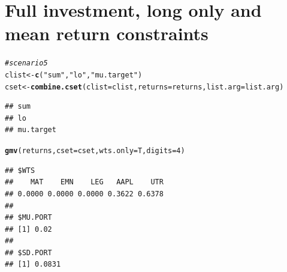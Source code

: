 \documentclass{uwstat518}\usepackage[]{graphicx}\usepackage[]{color}
\makeatletter
\newcommand{\hlstr}[1]{\textcolor[rgb]{0.192,0.494,0.8}{#1}}%
\newcommand{\hlcom}[1]{\textcolor[rgb]{0.678,0.584,0.686}{\textit{#1}}}%
\newcommand{\hlkwd}[1]{\textcolor[rgb]{0.737,0.353,0.396}{\textbf{#1}}}%
\newenvironment{kframe}{%
 \def\at@end@of@kframe{}%
 \ifinner\ifhmode%
  \def\at@end@of@kframe{\end{minipage}}%
  \begin{minipage}{\columnwidth}%
 \fi\fi%
 \def\FrameCommand##1{\hskip\@totalleftmargin \hskip-\fboxsep
 \colorbox{shadecolor}{##1}\hskip-\fboxsep
     \hskip-\linewidth \hskip-\@totalleftmargin \hskip\columnwidth}%
 \MakeFramed {\advance\hsize-\width
   \@totalleftmargin\z@ \linewidth\hsize
   \@setminipage}}%
 {\par\unskip\endMakeFramed%
 \at@end@of@kframe}
\newenvironment{knitrout}{}{} %
\makeatother
\begin{document}
\newpage
\section{Full investment, long only and mean return constraints}
\begin{knitrout}
\color{fgcolor}\begin{kframe}
\begin{alltt}
\hlcom{# scenario 5}
clist <- \hlkwd{c}(\hlstr{"sum"},\hlstr{"lo"},\hlstr{"mu.target"})
cset <-\hlkwd{combine.cset}(clist=clist,returns=returns,list.arg=list.arg)
\end{alltt}
\begin{verbatim}
## sum 
## lo 
## mu.target
\end{verbatim}
\begin{alltt}
\hlkwd{gmv}(returns, cset=cset, wts.only=T,digits=4)
\end{alltt}
\begin{verbatim}
## $WTS
##    MAT    EMN    LEG   AAPL    UTR 
## 0.0000 0.0000 0.0000 0.3622 0.6378 
## 
## $MU.PORT
## [1] 0.02
## 
## $SD.PORT
## [1] 0.0831
\end{verbatim}
\end{kframe}
\end{knitrout}

\newpage
\end{document}
